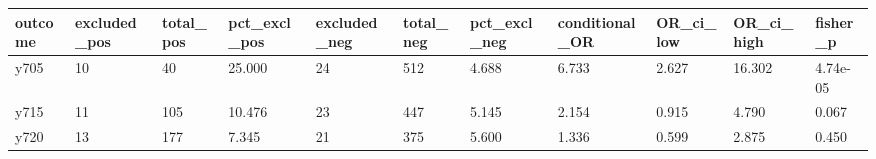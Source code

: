 \begin{tabular}{lllllllllll}
\toprule
outcome & excluded\_pos & total\_pos & pct\_excl\_pos & excluded\_neg & total\_neg & pct\_excl\_neg & conditional\_OR & OR\_ci\_low & OR\_ci\_high & fisher\_p \\
\midrule
y705 & 10 & 40 & 25.000 & 24 & 512 & 4.688 & 6.733 & 2.627 & 16.302 & 4.74e-05 \\
y715 & 11 & 105 & 10.476 & 23 & 447 & 5.145 & 2.154 & 0.915 & 4.790 & 0.067 \\
y720 & 13 & 177 & 7.345 & 21 & 375 & 5.600 & 1.336 & 0.599 & 2.875 & 0.450 \\
\bottomrule
\end{tabular}
